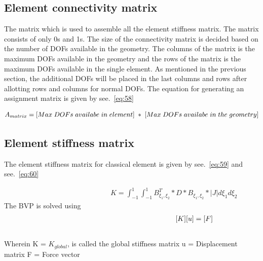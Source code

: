 \documentclass[fleqn, 12.5pt,a4paper]{report}
\newcommand\tab[1][1cm]{\hspace*{#1}}
\begin{document}
\subsection{Element connectivity matrix}
The matrix which is used to assemble all the element stiffness matrix. The matrix consists of only 0s and 1s. The size of the connectivity matrix is decided based on the number of DOFs available in the geometry. The columns of the matrix is the maximum DOFs available in the geometry and the rows of the matrix is the maximum DOFs available in the single element. As mentioned in the previous section, the additional DOFs will be placed in the last columns and rows after allotting rows and columns for normal DOFs. The equation for generating an assignment matrix is given by  see.~\autoref{eq:58}

\begin{align}\label{eq:58}
A_{matrix} = [Max\hspace{0.1cm} DOFs\hspace{0.1cm} availabe\hspace{0.1cm} in \hspace{0.1cm} element]\hspace{0.1cm} *\hspace{0.1cm} [Max\hspace{0.1cm} DOFs \hspace{0.1cm}availabe\hspace{0.1cm} in\hspace{0.1cm} the\hspace{0.1cm} geometry]
\end{align}

\subsection{ {Element stiffness matrix}}
The element stiffness matrix for classical element is given by see.~\autoref{eq:59}
and see.~\autoref{eq:60}\cite{khoei2014extended}

\begin{align}\label{eq:59}
\hspace{5cm}K = \int_{-1}^{1} \int_{-1}^{1} B_{\xi_1, \xi_2}^T*D*B_{\xi_1, \xi_2}*| J | d\xi_1d\xi_2 
\end{align}
The BVP is solved using
\begin{align}\label{eq:60}
\hspace{6.25cm}[K][u] = [F] 
\end{align}\vspace{-1cm}
\\
Wherein \newline
\tab[1cm] K = $K_{global}$, is called the global stiffness matrix\newline
\tab[1cm] u = Displacement matrix\newline
\tab[1cm] F = Force vector
\end{document}
